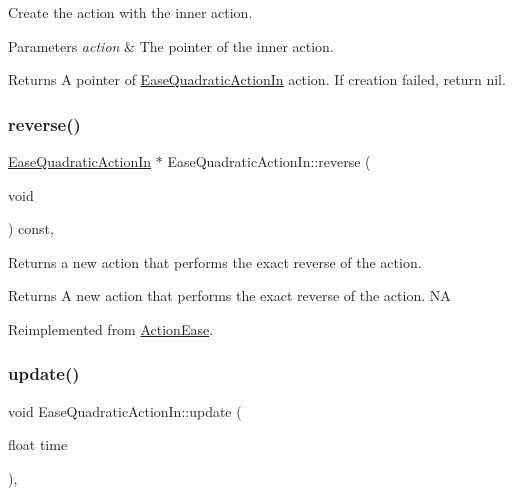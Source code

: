 Create the action with the inner action. 


\begin{DoxyParams}{Parameters}
{\em action} & The pointer of the inner action. \\
\hline
\end{DoxyParams}
\begin{DoxyReturn}{Returns}
A pointer of \hyperlink{classEaseQuadraticActionIn}{Ease\+Quadratic\+Action\+In} action. If creation failed, return nil. 
\end{DoxyReturn}
\mbox{\label{classEaseQuadraticActionIn_ab6115c4fb960331b561bb6eeadf81616}} 
\subsubsection{\texorpdfstring{reverse()}{reverse()}}
{\footnotesize\ttfamily \hyperlink{classEaseQuadraticActionIn}{Ease\+Quadratic\+Action\+In} $\ast$ Ease\+Quadratic\+Action\+In\+::reverse (\begin{DoxyParamCaption}\item[{void}]{ }\end{DoxyParamCaption}) const\hspace{0.3cm}{\ttfamily [override]}, {\ttfamily [virtual]}}

Returns a new action that performs the exact reverse of the action.

\begin{DoxyReturn}{Returns}
A new action that performs the exact reverse of the action.  NA 
\end{DoxyReturn}


Reimplemented from \hyperlink{classActionEase_ab99eb083fa033fae1d6c948fdc730782}{Action\+Ease}.

\mbox{\label{classEaseQuadraticActionIn_ac773c27eef9d3d90ae1021d75ad25301}} 
\subsubsection{\texorpdfstring{update()}{update()}}
{\footnotesize\ttfamily void Ease\+Quadratic\+Action\+In\+::update (\begin{DoxyParamCaption}\item[{float}]{time }\end{DoxyParamCaption})\hspace{0.3cm}{\ttfamily [override]}, {\ttfamily [virtual]}}

